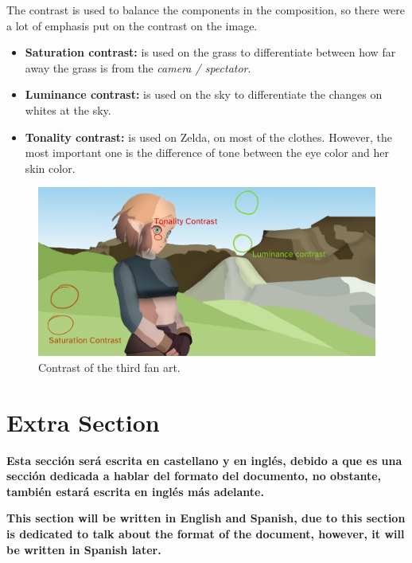 \documentclass{cup-pan}
\begin{document}
            The contrast is used to balance the components in the composition, so there were a lot of emphasis put on the contrast on the image.\\
            \begin{itemize}
                \item \textbf{Saturation contrast:} is used on the grass to differentiate between how far away the grass is from the \textit{camera / spectator}.
                \item \textbf{Luminance contrast: } is used on the sky to differentiate the changes on whites at the sky. 
                \item \textbf{Tonality contrast: } is used on Zelda, on most of the clothes. However, the most important one is the difference of tone between the eye color and her skin color. 
            \end{itemize}
            \begin{figure}[H]
                \includegraphics[width=\textwidth]{Fanart3/0_Analisi/contrast.png}
                \caption{Contrast of the third fan art.}
            \end{figure}



    \newpage
\newpage
\section{Extra Section}
\begin{multicols}{2}

\textbf{Esta sección será escrita en castellano y en inglés, debido a que es una sección dedicada a hablar del formato del documento, no obstante, también estará escrita en inglés más adelante.\\}

\columnbreak

\textbf{This section will be written in English and Spanish, due to this section is dedicated to talk about the format of the document, however, it will be written in Spanish later.\\}
\end{multicols}
\end{document}
